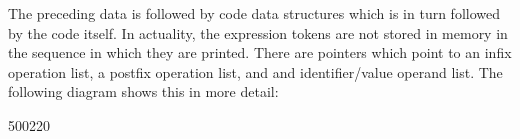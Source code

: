 The preceding data is followed by code data structures which is in turn
followed by the code itself.   In actuality, the expression tokens are not
stored in memory in the sequence in which they are printed.   There are
pointers which point to an infix operation list, a postfix operation list,
and and identifier/value operand list.   The following diagram shows this
in more detail:
\begin{fast_picture}{500}{220}
\savFboxpos\savGboxpos
{}
\nextGbox\nextFbox
                          \savBboxpos{}
                                \putboxafterarrow{}
                                \boxtoright{}
                                \boxtoright\valbox{[~]}
                                \boxtoright\valbox{$\sim$}
                          \unsavBboxpos{}
                          \boxtoright
                          \savBboxpos{}
                                \putboxafterarrow\valbox{(}
                                \boxtoright\valbox{$\sim$}
                                \boxtoright{}
                                \boxtoright\valbox{[}
                                \boxtoright{}
                                \boxtoright\valbox{]}
                                \boxtoright\valbox{)}
                          \unsavBboxpos{}\boxtoright
                          \putboxafterarrow{}
                          \boxtoright{}
                          \boxtoright{}
                          \boxtoright{}

\end{fast_picture}
